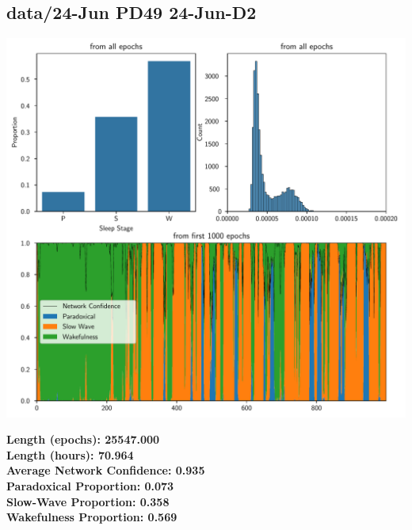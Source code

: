 
        \subsection*{ data/24-Jun PD49 24-Jun-D2 }
        \begin{center}
        \begin{adjustbox}{width=1\textwidth}
        \includegraphics[page=1]{figs.pdf}
        \end{adjustbox}
        \end{center}
        \large\textbf{Length (epochs): 25547.000}\\
        \textbf{Length (hours): 70.964}\\
        \textbf{Average Network Confidence: 0.935}\\
        \textbf{Paradoxical Proportion: 0.073}\\
        \textbf{Slow-Wave Proportion: 0.358}\\
        \textbf{Wakefulness Proportion: 0.569}\\
        
